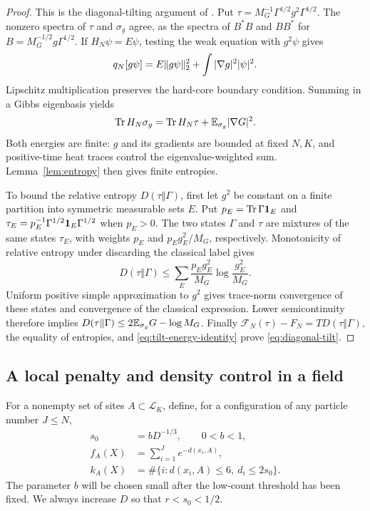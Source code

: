 \begin{proof}
This is the diagonal-tilting argument of
\citet[Section~4, ``Two-color localization and diagonal tilting'']{B}.
Put $\tau=M_G^{-1}\Gamma^{1/2}g^2\Gamma^{1/2}$.
The nonzero spectra of $\tau$ and $\sigma_g$ agree, as the
spectra of $B^*B$ and $BB^*$ for
$B=M_G^{-1/2}g\Gamma^{1/2}$. If $H_N\psi=E\psi$,
testing the weak equation with $g^2\psi$ gives
\[
 q_N[g\psi]=E\lVert g\psi\rVert_2^2+
                      \int|\nabla g|^2|\psi|^2.
\]
Lipschitz multiplication preserves the hard-core boundary condition.
Summing in a Gibbs eigenbasis yields
\begin{equation}\label{eq:tilt-energy-identity}
 \operatorname{Tr} H_N\sigma_g=\operatorname{Tr} H_N\tau+
                         \mathbb E_{\sigma_g}|\nabla G|^2.
\end{equation}
Both energies are finite: $g$ and its gradients are bounded at fixed
$N,K$, and positive-time heat traces control the eigenvalue-weighted
sum. Lemma~\ref{lem:entropy} then gives finite entropies.

To bound the relative entropy $D(\tau\Vert\Gamma)$, first let
$g^2$ be constant on a finite partition into symmetric measurable
sets $E$. Put
$p_E=\operatorname{Tr}\Gamma\mathbf 1_E$ and
$\tau_E=p_E^{-1}\Gamma^{1/2}\mathbf 1_E\Gamma^{1/2}$
when $p_E>0$. The two states $\Gamma$ and $\tau$ are mixtures
of the same states $\tau_E$, with weights $p_E$ and
$p_Eg_E^2/M_G$, respectively. Monotonicity of relative entropy under
discarding the classical label \citep{Lindblad1975} gives
\[
 D(\tau\Vert\Gamma)\le
 \sum_E\frac{p_Eg_E^2}{M_G}\log\frac{g_E^2}{M_G}.
\]
Uniform positive simple approximation to $g^2$ gives trace-norm
convergence of these states and convergence of the classical expression.
Lower semicontinuity therefore implies
$D(\tau\Vert\Gamma)\le2\mathbb E_{\sigma_g}G-\log M_G$.
Finally
$\mathcal F_N(\tau)-F_N=TD(\tau\Vert\Gamma)$,
the equality of entropies, and \eqref{eq:tilt-energy-identity} prove
\eqref{eq:diagonal-tilt}.
\end{proof}

\subsection{A local penalty and density control in a field}

For a nonempty set of sites $A\subset\mathcal L_K$, define, for a
configuration of any particle number $J\le N$,
\begin{align}
 s_0&=bD^{-1/3},\qquad 0<b<1,\label{eq:s0}\\
 f_A(X)&=\sum_{i=1}^J e^{-d(x_i,A)},\label{eq:weighted-count}\\
 k_A(X)&=\#\{i:d(x_i,A)\le6,\ d_i\le2s_0\}.
                                      \label{eq:localized-close-count}
\end{align}
The parameter $b$ will be chosen small after the low-count threshold
has been fixed. We always increase $D$ so that $r<s_0<1/2$.

